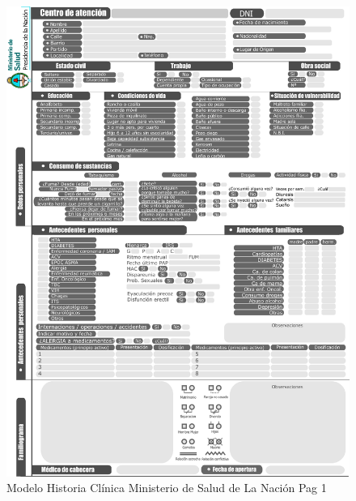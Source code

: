 \begin{figure}[H]
    \centering
    \includegraphics[scale=0.7]{resourse/historia-clinica-f.jpg}
    \caption{Modelo Historia Clínica Ministerio de Salud de La Nación Pag 1}
    \label{fig:06}
\end{figure}  

